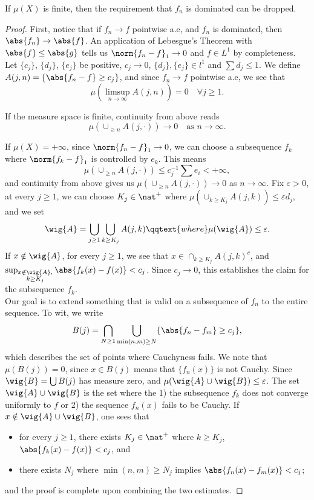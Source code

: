 \documentclass[../../main.tex]{subfiles}
\begin{document}
\begin{remark}
    If $\mu(X)$ is finite, then the requirement that $f_n$ is dominated can be dropped.
\end{remark}
\begin{proof}
    First, notice that if $f_n\to f$ pointwise a.e, and $f_n$ is dominated, then $\abs{f_n}\to \abs{f}$. An application of Lebesgue's Theorem with $\abs{f}\leq \abs{g}$ tells us $\norm{f_n - f}_{1}\to 0$ and $f\in L^1$ by completeness.\\
    
    Let $\{c_j\}$, $\{d_j\}$, $\{e_j\}$ be positive, $c_j\to 0$, $\{d_j\},\{e_j\}\in l^1$ and $\sum d_j \leq 1$. We define $A(j,n) = \{\abs{f_n - f}\geq c_j\}$, and since $f_n\to f$ pointwise a.e, we see that
    \[
        \mu(\limsup_{n\to\infty} A(j,n)) = 0\quad\forall j\geq 1.
    \]
    \begin{note}
        If the measure space is finite, continuity from above reads
        \[
            \mu(\cup_{\geq n} A(j,\cdot))\to 0 \quad\text{as }n\to\infty.
        \]
    \end{note}
    If $\mu(X)=+\infty$, since $\norm{f_n - f}_{1}\to 0$, we can choose a subsequence $f_k$ where $\norm{f_k - f}_{1}$ is controlled by $e_k$. This means
    \[
        \mu(\cup_{\geq n} A(j,\cdot))\leq c_j^{-1}\sum e_{i} <+\infty,
    \]
    and continuity from above gives us $\mu(\cup_{\geq n}A(j,\cdot))\to 0$ as $n\to \infty$. Fix $\varepsilon>0$, at every $j\geq 1$, we can choose $K_j\in \nat^+$ where $\mu(\cup_{k\geq K_j} A(j,k))\leq\varepsilon d_j$, and we set
    \[
        \wig{A} = \bigcup_{j\geq 1}\bigcup_{k\geq K_j}A(j,k)\qqtext{where}\mu(\wig{A})\leq\varepsilon.
    \]
    If $x\notin \wig{A}$, for every $j\geq 1$, we see that $x\in \cap_{k\geq K_j} A(j,k)^c$, and $\sup_{\substack{{x\notin\wig{A}},\\ {k\geq K_j}}}\abs{f_k(x) - f(x)}< c_j$. Since $c_j\to 0$, this establishes the claim for the subsequence $f_k$.\\

    Our goal is to extend something that is valid on a subsequence of $f_n$ to the entire sequence. To wit, we write 
    \[B(j) = \bigcap_{N\geq 1}\bigcup_{\min(n,m)\geq N}\{\abs{f_n - f_m}\geq c_j\},\]
    which describes the set of points where Cauchyness fails. We note that $\mu(B(j))=0$, since $x\in B(j)$ means that $\{f_n(x)\}$ is not Cauchy. Since $\wig{B} = \bigcup B(j)$ has measure zero, and $\mu(\wig{A}\cup \wig{B})\leq\varepsilon$. The set $\wig{A}\cup\wig{B}$ is the set where the 1) the subsequence $f_k$ does not converge uniformly to $f$ or 2) the sequence $f_n(x)$ fails to be Cauchy. If $x\notin \wig{A}\cup\wig{B}$, one sees that
    \begin{itemize}
        \item for every $j\geq 1$, there exists $K_j\in \nat^+$ where $k\geq K_j$, $\abs{f_{k}(x)- f(x)} < c_j$, and
        \item there exists $N_j$ where $\min(n,m)\geq N_j$ implies $\abs{f_n(x) - f_m(x)} < c_j$;
    \end{itemize}
    and the proof is complete upon combining the two estimates.
\end{proof}
\end{document}
